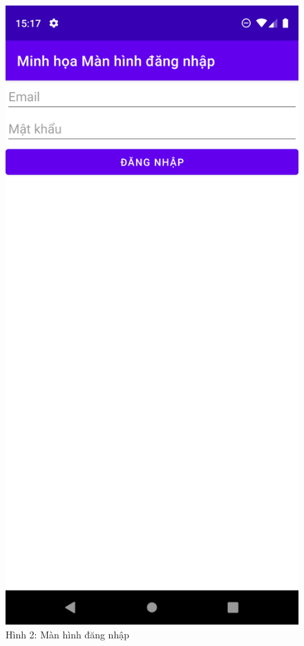 \documentclass{beamer}
\begin{document}
\begin{frame}
    \begin{columns}
        \begin{figure}
            \centering
            \includegraphics[height=0.7\textheight]{images/24.png}
            \caption{\centering\tiny{Hình 2: Màn hình đăng nhập}}


\end{figure}
\end{columns}
\end{frame}
\end{document}

